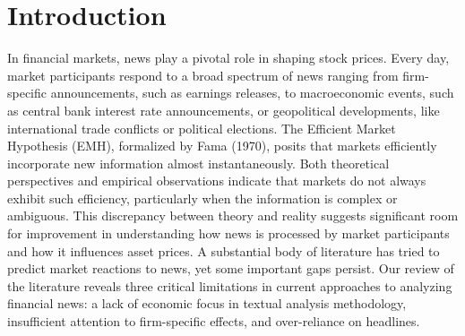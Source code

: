 \section{Introduction}
In financial markets, news play a pivotal role in shaping stock prices. Every day, market participants respond to a broad spectrum of news ranging from firm-specific announcements, such as earnings releases, to macroeconomic events, such as central bank interest rate announcements, or geopolitical developments, like international trade conflicts or political elections. The Efficient Market Hypothesis (EMH), formalized by 
\cite{fama1970efficient} Fama (1970), 
posits that markets efficiently incorporate new information almost instantaneously. Both theoretical perspectives and empirical observations indicate that markets do not always exhibit such efficiency, particularly when the information is complex or ambiguous. This discrepancy between theory and reality suggests significant room for improvement in understanding how news is processed by market participants and how it influences asset prices.
%
A substantial body of literature has tried to predict market reactions to news, yet some important gaps persist. Our review of the literature reveals three critical limitations in current approaches to analyzing financial news: a lack of economic focus in textual analysis methodology, insufficient attention to firm-specific effects, and over-reliance on headlines.

